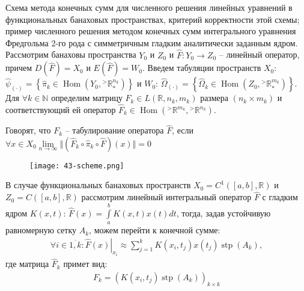 \documentclass[__main__.tex]{subfiles}
\newcommand{\stp}{\operatorname{stp}}
\newcommand{\Hom}{\operatorname{Hom}}
\begin{document}
Схема метода конечных сумм для численного решения линейных уравнений в функциональных банаховых пространствах, критерий корректности этой схемы; пример численного решения методом конечных сумм интегрального уравнения Фредгольма 2-го рода с симметричным гладким аналитически заданным ядром.\\

Рассмотрим банаховы пространства $Y_0$ и $Z_0$ и $\hat{F}\colon{Y_0\rightarrow Z_0}$ -- линейный оператор, причем $D(\hat{F})=X_0$ и $E(\hat{F})=W_0$. Введем табуляции пространств $X_0$: $\hat\psi_{(\cdot)}=\left\{ \hat{\pi}_k\in\Hom(Y_0,{^>\mathbb{R}^{n_k}_{*}}) \right\}$ и $W_0$: $\hat{\Omega}_{(\cdot)}=\left\{ \hat\Omega_k\in\Hom(Z_0,{^>\mathbb{R}^{m_k}_{*}}) \right\}$. Для $\forall k\in\mathbb{N}$ определим матрицу $F_k\in L(\mathbb{R},n_k,m_k)$ размера $(n_k\times m_k)$ и соответствующий ей оператор $\hat{F}_k\in\Hom({^>\mathbb{R}^{m_k}},{^>\mathbb{R}^{n_k}})$.

\begin{definition}
Говорят, что $F_k$ -- табулирование оператора $\hat{F}$, если $\forall x\in X_0 \lim\limits_{n\rightarrow\infty}\Vert(\hat{F}_k\circ\hat\pi_{k}\circ\hat{F})(x)\Vert=0$
\end{definition}

\begin{figure}[h]
\centering
\texttt{[image: 43-scheme.png]}
\end{figure}

В случае функциональных банаховых пространств $X_0=C^{1}\left([a,b],\mathbb{R}\right)$ и $Z_0=C\left([a,b],\mathbb{R}\right)$ рассмотрим линейный интегральный оператор $\hat{F}$ с гладким ядром $K(x,t)$: $\hat{F}(x)=\int\limits_{a}^{b}K(x,t)x(t)dt$, тогда, задав устойчивую равномерную сетку $A_k$, можем перейти к конечной сумме:
\begin{gather}
\forall{i\in\overline{1,k}}\colon
\left.\hat{F}(x)\right|_{x_i}
\approx
\sum_{j=1}^{k}K(x_i,t_j)x(t_j)\stp(A_k),
\end{gather}
где матрица $\hat{F}_k$ примет вид:
\begin{gather}
F_k = \left( K(x_i,t_j)\stp(A_k) \right)_{k\times k}
\end{gather}
\end{document}
